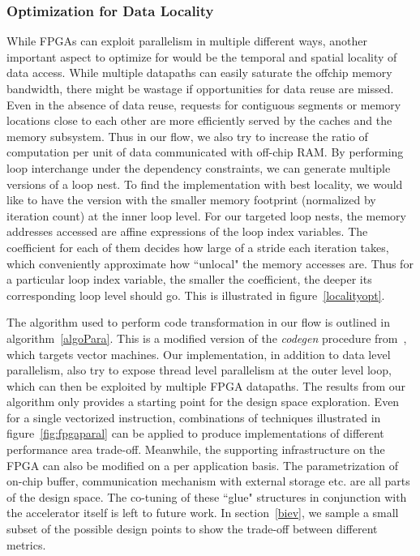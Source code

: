 \subsubsection{Optimization for Data Locality}
While FPGAs can exploit parallelism in 
multiple different ways, another important aspect to optimize for would be the temporal and spatial locality of data access. While multiple datapaths can
easily saturate the offchip memory bandwidth, there might be wastage if opportunities for data reuse are missed. 
Even in the absence of data reuse, requests for 
contiguous segments or memory locations close to each other are more efficiently served by the caches and the memory subsystem.
Thus in our flow, we also try to increase the ratio of computation per unit of data communicated with off-chip RAM. By performing loop interchange under the dependency constraints, we can generate multiple versions of a loop nest. To find the implementation with best locality, we would like to have the version with the smaller memory footprint (normalized by iteration count) at the inner loop level.
For our targeted loop nests, the memory addresses accessed are affine expressions of the loop index variables. The coefficient for each of them
decides how large of a stride each iteration takes, which conveniently
approximate how ``unlocal" the memory accesses are. 
Thus for a particular loop index variable, the smaller the coefficient, the deeper its corresponding loop level should go.
This is illustrated in figure~\ref{localityopt}. 



The algorithm used to perform code transformation in our flow is outlined in algorithm~\ref{algoPara}. This is a modified version of the \textit{codegen}
procedure from~\cite{Kennedy:2001:OCM:502981}, which targets vector machines.
Our implementation, in addition to data level parallelism, also try to expose
thread level parallelism at the outer level loop, which can then be exploited by multiple FPGA datapaths. 
The results from our algorithm only provides a starting point for the design space exploration. Even for a single vectorized instruction, combinations of techniques illustrated in figure~\ref{fig:fpgaparal} can be applied to
produce implementations of different performance area trade-off. Meanwhile, 
the supporting infrastructure on the FPGA can also be modified on a per
application basis. The parametrization of on-chip buffer, communication mechanism with external
storage etc. are all parts of the design space. The co-tuning of these ``glue"
structures in conjunction
with the accelerator itself is left to future work.  In section~\ref{biev}, we sample a small subset of the possible design points
to show the trade-off between different metrics.


